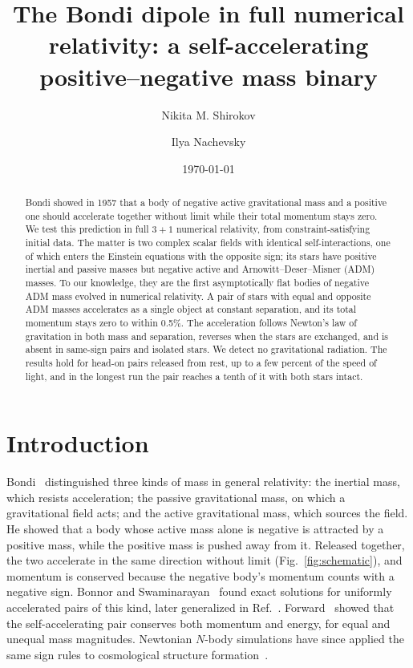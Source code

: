 \documentclass[twocolumn,floatfix,aps,prd,superscriptaddress,nofootinbib]{revtex4-2}
\begin{document}
\title{The Bondi dipole in full numerical relativity: a self-accelerating positive--negative mass binary}

\author{Nikita M. Shirokov}
\author{Ilya Nachevsky}
\date{\today}

\begin{abstract}
Bondi showed in 1957 that a body of negative active gravitational mass and a positive one should accelerate together without limit while their total momentum stays zero. We test this prediction in full $3{+}1$ numerical relativity, from constraint-satisfying initial data. The matter is two complex scalar fields with identical self-interactions, one of which enters the Einstein equations with the opposite sign; its stars have positive inertial and passive masses but negative active and Arnowitt--Deser--Misner (ADM) masses. To our knowledge, they are the first asymptotically flat bodies of negative ADM mass evolved in numerical relativity. A pair of stars with equal and opposite ADM masses accelerates as a single object at constant separation, and its total momentum stays zero to within 0.5\%. The acceleration follows Newton's law of gravitation in both mass and separation, reverses when the stars are exchanged, and is absent in same-sign pairs and isolated stars. We detect no gravitational radiation. The results hold for head-on pairs released from rest, up to a few percent of the speed of light, and in the longest run the pair reaches a tenth of it with both stars intact.
\end{abstract}

\maketitle

\section{Introduction}
\label{sec:intro}

Bondi~\cite{bondi1957} distinguished three kinds of mass in general relativity: the inertial mass, which resists acceleration; the passive gravitational mass, on which a gravitational field acts; and the active gravitational mass, which sources the field. He showed that a body whose active mass alone is negative is attracted by a positive mass, while the positive mass is pushed away from it. Released together, the two accelerate in the same direction without limit (Fig.~\ref{fig:schematic}), and momentum is conserved because the negative body's momentum counts with a negative sign. Bonnor and Swaminarayan~\cite{bonnor_swami1964} found exact solutions for uniformly accelerated pairs of this kind, later generalized in Ref.~\cite{bicak1983}. Forward~\cite{forward1990} showed that the self-accelerating pair conserves both momentum and energy, for equal and unequal mass magnitudes. Newtonian $N$-body simulations have since applied the same sign rules to cosmological structure formation~\cite{manfredi2018,manfredi2026}.
\end{document}
